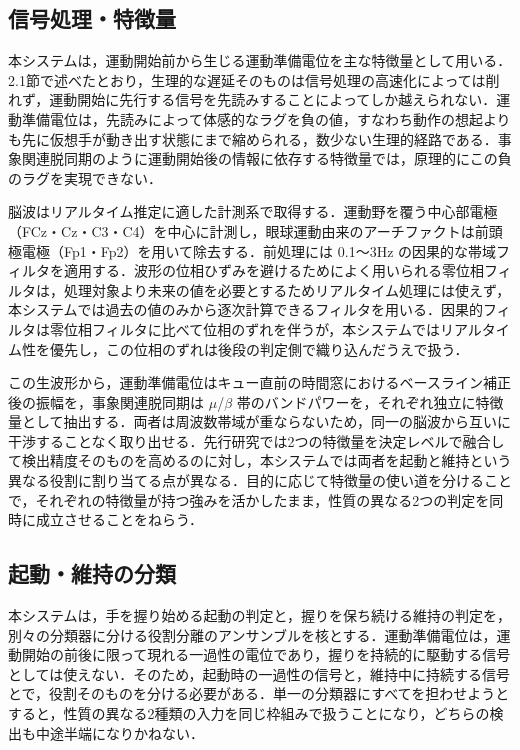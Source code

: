 \documentclass[twoside]{wiss}
\begin{document}
\subsection{信号処理・特徴量}

本システムは，運動開始前から生じる運動準備電位を主な特徴量として用いる．2.1節で述べたとおり，生理的な遅延そのものは信号処理の高速化によっては削れず，運動開始に先行する信号を先読みすることによってしか越えられない．運動準備電位は，先読みによって体感的なラグを負の値，すなわち動作の想起よりも先に仮想手が動き出す状態にまで縮められる，数少ない生理的経路である．事象関連脱同期のように運動開始後の情報に依存する特徴量では，原理的にこの負のラグを実現できない．

脳波はリアルタイム推定に適した計測系で取得する．運動野を覆う中心部電極（FCz・Cz・C3・C4）を中心に計測し，眼球運動由来のアーチファクトは前頭極電極（Fp1・Fp2）を用いて除去する．前処理には 0.1〜3Hz の因果的な帯域フィルタを適用する．波形の位相ひずみを避けるためによく用いられる零位相フィルタは，処理対象より未来の値を必要とするためリアルタイム処理には使えず，本システムでは過去の値のみから逐次計算できるフィルタを用いる．因果的フィルタは零位相フィルタに比べて位相のずれを伴うが，本システムではリアルタイム性を優先し，この位相のずれは後段の判定側で織り込んだうえで扱う．

この生波形から，運動準備電位はキュー直前の時間窓におけるベースライン補正後の振幅を，事象関連脱同期は $\mu$/$\beta$ 帯のバンドパワーを，それぞれ独立に特徴量として抽出する．両者は周波数帯域が重ならないため，同一の脳波から互いに干渉することなく取り出せる．先行研究では2つの特徴量を決定レベルで融合して検出精度そのものを高めるのに対し\cite{liu2024}，本システムでは両者を起動と維持という異なる役割に割り当てる点が異なる．目的に応じて特徴量の使い道を分けることで，それぞれの特徴量が持つ強みを活かしたまま，性質の異なる2つの判定を同時に成立させることをねらう．

\subsection{起動・維持の分類}

本システムは，手を握り始める起動の判定と，握りを保ち続ける維持の判定を，別々の分類器に分ける役割分離のアンサンブルを核とする．運動準備電位は，運動開始の前後に限って現れる一過性の電位であり，握りを持続的に駆動する信号としては使えない．そのため，起動時の一過性の信号と，維持中に持続する信号とで，役割そのものを分ける必要がある．単一の分類器にすべてを担わせようとすると，性質の異なる2種類の入力を同じ枠組みで扱うことになり，どちらの検出も中途半端になりかねない．
\end{document}
